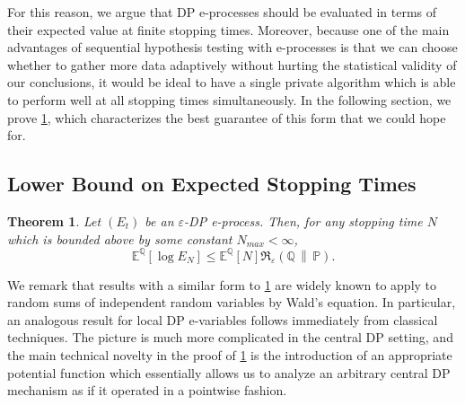\documentclass{article}
\newcommand{\Rdiv}[3][\eps]{%
  \mathfrak{R}_{#1}\!\left(#2\,\middle\|\,#3\right)%
}
\newcommand{\Null}{\mathbb{P}}
\newcommand{\E}{\mathbb{E}}
\newcommand{\Alt}{\mathbb{Q}}
\newcommand{\opt}{\Rdiv{\Alt}{\Null}}
\newcommand{\eps}{\varepsilon}
\newtheorem{theorem}{Theorem}[section]
\begin{document}
For this reason, we argue that DP e-processes should be evaluated in terms of their expected value at finite stopping times. 
Moreover, because one of the main advantages of sequential hypothesis testing with e-processes is that we can choose whether to gather more data adaptively without hurting the statistical validity of our conclusions, it would be ideal to have a single private algorithm which is able to perform well at all stopping times simultaneously. In the following section, we prove \cref{thm:agr-ub}, which characterizes the best guarantee of this form that we could hope for.

\subsection{Lower Bound on Expected Stopping Times}



      \begin{theorem}\label{thm:agr-ub}
          Let $(E_t)$ be an $\varepsilon$-DP e-process. Then, for any stopping time $N$ which is bounded above by some constant $N_{max} <\infty$,
        \begin{equation*}
            \E^\Alt\left[\log E_N \right] \leq \E^\Alt[N] \opt.
        \end{equation*} 
      \end{theorem}

We remark that results with a similar form to \cref{thm:agr-ub} are widely known to apply to random sums of independent random variables by Wald's equation. In particular, an analogous result for local DP e-variables follows immediately from classical techniques. The picture is much more complicated in the central DP setting, and the main technical novelty in the proof of \cref{thm:agr-ub} is the introduction of an appropriate potential function which essentially allows us to analyze an arbitrary central DP mechanism as if it operated in a pointwise fashion.
\end{document}
